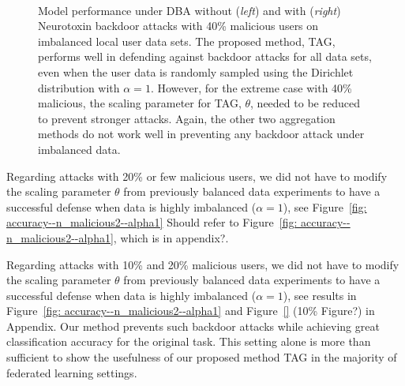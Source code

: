 \documentclass{article} %
\newcommand{\yli}[1]{{\color{cyan}#1}}
\begin{document}
\begin{figure}[htp]
\centering
  \begin{subfigure}{.35\textwidth}
  \centering
  \end{subfigure}%
  ~
  \begin{subfigure}{.65\textwidth}
  \centering
  \end{subfigure}%

\caption{\footnotesize Model performance under DBA without (\textit{left}) and with (\textit{right}) Neurotoxin backdoor attacks with 40\% malicious users on imbalanced local user data sets. The proposed method, TAG, performs well in defending against backdoor attacks for all data sets, even when the user data is randomly sampled using the Dirichlet distribution with $\alpha = 1$. However, for the extreme case with 40\% malicious, the scaling parameter for TAG, $\theta$, needed to be reduced to prevent stronger attacks. Again, the other two aggregation methods do not work well in preventing any backdoor attack under imbalanced data.}
\label{fig: accuracy--n_malicious4--alpha1}

\end{figure}

Regarding attacks with 20\% or few malicious users, we did not have to modify the scaling parameter $\theta$ from previously balanced data experiments to have a successful defense when data is highly imbalanced ($\alpha = 1$), see Figure~\ref{fig: accuracy--n_malicious2--alpha1} \yli{Should refer to Figure~\ref{fig: accuracy--n_malicious2--alpha1}, which is in appendix?}. 

\yli{Regarding attacks with 10\% and 20\% malicious users, we did not have to modify the scaling parameter $\theta$ from previously balanced data experiments to have a successful defense when data is highly imbalanced ($\alpha = 1$), see results in Figure~\ref{fig: accuracy--n_malicious2--alpha1} and Figure~\ref{} (10\% Figure?) in Appendix.}
Our method prevents such backdoor attacks while achieving great classification accuracy for the original task. This setting alone is more than sufficient to show the usefulness of our proposed method TAG in the majority of federated learning settings.
\end{document}
